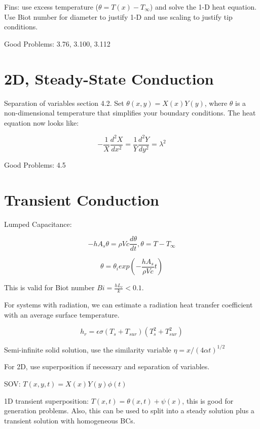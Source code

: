 \documentclass[paper=letter, fontsize=11pt]{scrartcl}
\numberwithin{equation}{section}        %
\numberwithin{figure}{section}          %
\numberwithin{table}{section}               %
\begin{document}
Fins: use excess temperature ($\theta = T(x) - T_\infty$) and solve the 1-D heat equation. Use Biot number for diameter to justify 1-D and use scaling to justify tip conditions.

\bigskip Good Problems: 3.76, 3.100, 3.112


\section{2D, Steady-State Conduction}

Separation of variables section 4.2. Set $\theta(x,y) = X(x)Y(y)$, where $\theta$ is a non-dimensional temperature that simplifies your boundary conditions. The heat equation now looks like:

\begin{equation}
-\frac{1}{X}\frac{d^2X}{dx^2} = \frac{1}{Y}\frac{d^2Y}{dy^2} = \lambda^2
\end{equation}

\bigskip Good Problems: 4.5


\section{Transient Conduction}

Lumped Capacitance:

\begin{equation}
-hA_s\theta = \rho Vc\frac{d \theta}{dt}, \theta = T-T_\infty
\end{equation}

\begin{equation}
\theta = \theta_i exp\left(-\frac{hA_s}{\rho Vc}t\right)
\end{equation}

This is valid for Biot number $Bi = \frac{hL_c}{k} < 0.1$.

For systems with radiation, we can estimate a radiation heat transfer coefficient with an average surface temperature.

\begin{equation}
h_r = \epsilon\sigma(T_s + T_{sur})(T_s^2 + T_{sur}^2)
\end{equation}

Semi-infinite solid solution, use the similarity variable $\eta = x/(4\alpha t)^{1/2}$

For 2D, use superposition if necessary and separation of variables.

SOV: $T(x,y,t) = X(x)Y(y)\phi(t)$

1D transient superposition: $T(x,t) = \theta(x,t) + \psi(x)$, this is good for generation problems. Also, this can be used to split into a steady solution plus a transient solution with homogeneous BCs.
\end{document}
